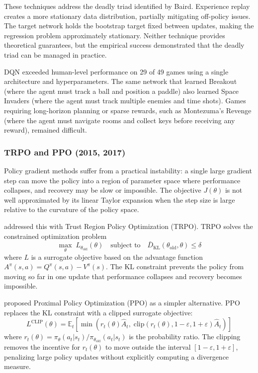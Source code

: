 These techniques address the deadly triad identified by Baird. Experience replay creates a more stationary data distribution, partially mitigating off-policy issues. The target network holds the bootstrap target fixed between updates, making the regression problem approximately stationary. Neither technique provides theoretical guarantees, but the empirical success demonstrated that the deadly triad can be managed in practice.

DQN exceeded human-level performance on 29 of 49 games using a single architecture and hyperparameters. The same network that learned Breakout (where the agent must track a ball and position a paddle) also learned Space Invaders (where the agent must track multiple enemies and time shots). Games requiring long-horizon planning or sparse rewards, such as Montezuma's Revenge (where the agent must navigate rooms and collect keys before receiving any reward), remained difficult.

\subsubsection{TRPO and PPO (2015, 2017)}

Policy gradient methods suffer from a practical instability: a single large gradient step can move the policy into a region of parameter space where performance collapses, and recovery may be slow or impossible. The objective $J(\theta)$ is not well approximated by its linear Taylor expansion when the step size is large relative to the curvature of the policy space.

\citet{Schulman2015} addressed this with Trust Region Policy Optimization (TRPO). TRPO solves the constrained optimization problem
\begin{equation}
\max_\theta \; L_{\theta_{\text{old}}}(\theta) \quad \text{subject to} \quad \bar{D}_{\mathrm{KL}}(\theta_{\text{old}}, \theta) \leq \delta
\end{equation}
where $L$ is a surrogate objective based on the advantage function $A^\pi(s,a) = Q^\pi(s,a) - V^\pi(s)$. The KL constraint prevents the policy from moving so far in one update that performance collapses and recovery becomes impossible.

\citet{Schulman2017} proposed Proximal Policy Optimization (PPO) as a simpler alternative. PPO replaces the KL constraint with a clipped surrogate objective:
\begin{equation}
L^{\text{CLIP}}(\theta) = \mathbb{E}_t \left[ \min\!\left( r_t(\theta) \hat{A}_t, \; \text{clip}(r_t(\theta), 1-\varepsilon, 1+\varepsilon) \hat{A}_t \right) \right]
\end{equation}
where $r_t(\theta) = \pi_\theta(a_t|s_t) / \pi_{\theta_{\text{old}}}(a_t|s_t)$ is the probability ratio. The clipping removes the incentive for $r_t(\theta)$ to move outside the interval $[1-\varepsilon, 1+\varepsilon]$, penalizing large policy updates without explicitly computing a divergence measure.

